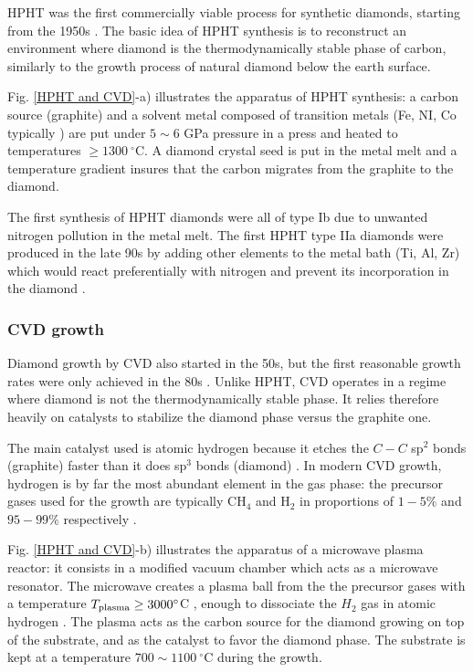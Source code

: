 \documentclass[a4paper,11pt]{report}
\begin{document}
\begin{refsection}
HPHT was the first commercially viable process for synthetic diamonds, starting from the 1950s \citep{barnard2000diamond, bundy1955man}. The basic idea of HPHT synthesis is to reconstruct an environment where diamond is the thermodynamically stable phase of carbon, similarly to the growth process of natural diamond below the earth surface. 

Fig. \ref{HPHT and CVD}-a) illustrates the apparatus of HPHT synthesis: a carbon source (graphite) and a solvent metal composed of transition metals (Fe, NI, Co typically \citep{bundy1963direct}) are put under $5 \sim 6$ GPa pressure in a press and heated to temperatures $\geq 1300\ ^\circ$C. A diamond crystal seed is put in the metal melt and a temperature gradient insures that the carbon migrates from the graphite to the diamond.

The first synthesis of HPHT diamonds were all of type Ib due to unwanted nitrogen pollution in the metal melt. The first HPHT type IIa diamonds were produced in the late 90s by adding other elements to the metal bath (Ti, Al, Zr) which would react preferentially with nitrogen and prevent its incorporation in the diamond \citep{burns1999growth, sumiya2002growth}.

\subsubsection{CVD growth}

Diamond growth by CVD also started in the 50s, but the first reasonable growth rates were only achieved in the 80s \citep{matsumoto1982growth, matsumoto1982vapor, kamo1983diamond}. Unlike HPHT, CVD operates in a regime where diamond is not the thermodynamically stable phase. It relies therefore heavily on catalysts to stabilize the diamond phase versus the graphite one. 

The main catalyst used is atomic hydrogen because it etches the $C-C$ sp$^2$ bonds (graphite) faster than it does sp$^3$ bonds (diamond) \citep{gracio2010diamond}. In modern CVD growth, hydrogen is by far the most abundant element in the gas phase: the precursor gases used for the growth are typically CH$_4$ and H$_2$ in proportions of $1-5\%$ and $95-99\%$ respectively \citep{achard2020chemical}.

Fig. \ref{HPHT and CVD}-b) illustrates the apparatus of a microwave plasma reactor: it consists in a modified vacuum chamber which acts as a microwave resonator. The microwave creates a plasma ball from the the precursor gases with a temperature $T_{\rm plasma} \geq 3000 ^\circ$C \citep{ashfold2020nitrogen}, enough to dissociate the $H_2$ gas in atomic hydrogen \citep{balmer2009chemical}. The plasma acts as the carbon source for the diamond growing on top of the substrate, and as the catalyst to favor the diamond phase. The substrate is kept at a temperature $700 \sim 1100\ ^\circ$C during the growth.


\end{refsection}
\end{document}
